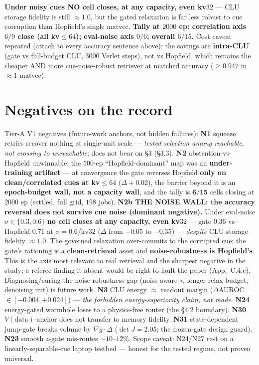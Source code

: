 \documentclass[11pt]{article}
\newcommand{\detJ}{\det J}
\begin{document}
\noindent \textbf{Under noisy cues NO cell closes, at any capacity, even kv$32$} --- CLU storage fidelity is still $\approx1.0$, but the gated relaxation is far less robust to cue corruption than Hopfield's single matvec. \textbf{Tally at $2000$ ep: correlation axis $6/9$ close (all kv$\le64$); eval-noise axis $0/6$; overall $6/15$.} Cost caveat repeated (attach to every accuracy sentence above): the savings are \textbf{intra-CLU} (gate vs full-budget CLU, $3000$ Verlet steps), not vs Hopfield, which remains the cheaper AND more cue-noise-robust retriever at matched accuracy ($\ge0.947$ in $\approx1$ matvec).

\section{Negatives on the record}
Tier-A V1 negatives (future-work anchors, not hidden failures): \textbf{N1} squeeze retries recover nothing at single-unit scale --- \emph{tested selection among reachable, not crossing to unreachable}; does not bear on \S3 (\S3.3). \textbf{N2} abstention-vs-Hopfield unwinnable; the $500$-ep ``Hopfield-dominant'' map was an \textbf{under-training artifact} --- at convergence the gate reverses Hopfield \textbf{only on clean/correlated cues at kv$\le64$} ($\Delta+0.02$), the barrier beyond it is an \textbf{epoch-budget wall, not a capacity wall}, and the tally is $\mathbf{6/15}$ cells closing at $2000$ ep (settled, full grid, $198$ jobs). \textbf{N2b THE NOISE WALL: the accuracy reversal does not survive cue noise (dominant negative).} Under eval-noise $\sigma\in\{0.3,0.6\}$ \textbf{no cell closes at any capacity, even kv$32$} --- gate $0.36$ vs Hopfield $0.71$ at $\sigma=0.6$/kv$32$ ($\Delta$ from $-0.05$ to $-0.35$) --- \emph{despite} CLU storage fidelity $\approx1.0$. The governed relaxation over-commits to the corrupted cue; the gate's rationing is a \textbf{clean-retrieval} asset and \textbf{noise-robustness is Hopfield's}. This is the axis most relevant to real retrieval and the sharpest negative in the study; a referee finding it absent would be right to fault the paper (App.~C.4.c). Diagnosing/curing the noise-robustness gap (noise-aware $\tau$, longer relax budget, denoising init) is future work. \textbf{N3} CLU energy $\approx$ readout margin ($\Delta$AUROC $\in[-0.004,+0.024]$) --- \emph{the forbidden energy-superiority claim, not made}. \textbf{N24} energy-gated wormhole loses to a physics-free router (the \S4.2 boundary). \textbf{N30} $V(\text{data})$-anchor does not transfer to memory fidelity. \textbf{N31} state-dependent jump-gate breaks volume by $\nabla g\cdot\Delta$ ($\detJ=2.05$; the frozen-gate design guard). \textbf{N23} smooth $z$-gate mis-routes $\sim10$--$12\%$. Scope caveat: N24/N27 rest on a linearly-separable-cue laptop testbed --- honest for the tested regime, not proven universal.
\end{document}
